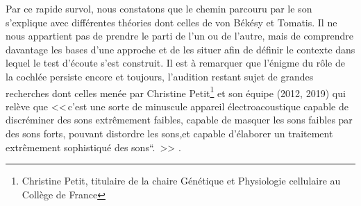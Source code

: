 Par ce rapide survol, nous constatons que  le 
chemin 
parcouru par 
le son s'explique avec différentes théories  dont celles de von Békésy et 
Tomatis. Il ne nous appartient pas de prendre le parti de l'un ou de l'autre, mais de comprendre 
davantage les bases d'une approche  et de les situer  afin de définir  le 
contexte dans lequel le test d'écoute s'est construit.
Il est à 
remarquer que l'énigme du 
rôle de la cochlée persiste encore et toujours, l'audition restant 
sujet de grandes 
recherches dont celles menée par Christine Petit\footnote{Christine Petit, titulaire de la 
	chaire Génétique et
	Physiologie cellulaire au Collège de France} et son équipe (2012, 
2019) %
qui relève que 
<<\,c'est une sorte de minuscule appareil électroacoustique capable
de discréminer des sons extrêmement faibles, capable de masquer
	les sons faibles par des sons forts, pouvant distordre les
	sons,et capable d'élaborer un traitement extrêmement
	sophistiqué des sons``. \,>> \autocite{petit_lookscience}.%


